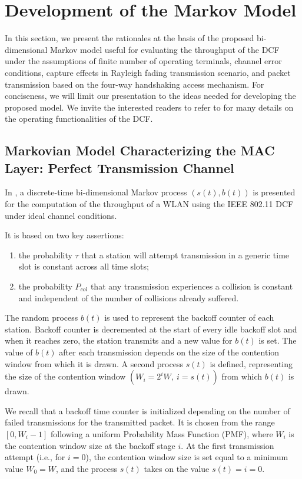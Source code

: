 \documentclass[10pt,onecolumn,a4paper]{IEEEtran}
\begin{document}
\section{Development of the Markov Model}
In this section, we present the rationales at the basis of the
proposed bi-dimensional Markov model useful for evaluating the
throughput of the DCF under the assumptions of finite number of
operating terminals, channel error conditions, capture effects in
Rayleigh fading transmission scenario, and packet transmission
based on the four-way handshaking access mechanism. For
conciseness, we will limit our presentation to the ideas needed
for developing the proposed model.
We invite the interested readers to refer to
\cite{standard_DCF_MAC,Bianchi} for many details on the operating
functionalities of the DCF.
\subsection{Markovian Model Characterizing the MAC Layer: Perfect Transmission Channel}
In \cite{Bianchi}, a discrete-time bi-dimensional Markov process
$(s(t),b(t))$ is presented for the computation of the throughput
of a WLAN using the IEEE 802.11 DCF under ideal channel
conditions.

It is based on two key assertions:
\begin{enumerate}
\item the probability $\tau$ that a station will attempt
transmission in a generic time slot is constant across all time
slots;
\item the probability $P_{col}$ that any transmission experiences
a collision is constant and independent of the number of
collisions already suffered.
\end{enumerate}
The random process $b(t)$ is used to represent the backoff
counter of each station. Backoff counter is decremented at the
start of every idle backoff slot and when it reaches zero, the
station transmits and a new value for $b(t)$ is set. The value of
$b(t)$ after each transmission depends on the size of the
contention window from which it is drawn.
A second process $s(t)$ is defined, representing the size of the
contention window $(W_i=2^i W,~i=s(t))$ from which $b(t)$ is
drawn.

We recall that a backoff time counter is initialized depending on the
number of failed transmissions for the transmitted packet. It is
chosen from the range $[0,W_i-1]$ following a uniform Probability
Mass Function (PMF), where $W_i$ is the contention window size at the
backoff stage $i$. At the first transmission attempt (i.e., for
$i=0$), the contention window size is set equal to a minimum value
$W_0=W$, and the process $s(t)$ takes on the value $s(t)=i=0$.
\end{document}
